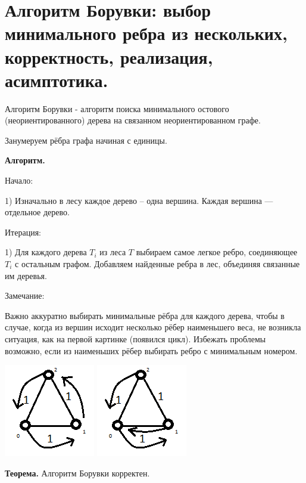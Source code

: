 \setcounter{section}{62}
\section{Алгоритм Борувки: выбор минимального ребра из нескольких, корректность, реализация, асимптотика.}

    Алгоритм Борувки - алгоритм поиска минимального остового (неориентированного) дерева на связанном неориентированном графе.
    
    Занумеруем рёбра графа начиная с единицы.
    
    \textbf{Алгоритм.} 
      
    Начало:
    
    1) Изначально в лесу каждое дерево – одна вершина. Каждая вершина --- отдельное дерево.
        
    Итерация:
    
    1) Для каждого дерева $T_i$ из леса $T$ выбираем самое легкое ребро, соединяющее $T_i$ с остальным графом. Добавляем найденные ребра в лес, объединяя связанные им деревья. 
    
    Замечание: 
    
    Важно аккуратно выбирать минимальные рёбра для каждого дерева, чтобы в случае, когда из вершин исходит несколько рёбер наименьшего веса, не возникла ситуация, как на первой картинке (появился цикл). Избежать проблемы возможно, если из наименьших рёбер выбирать ребро с минимальным номером. 

    \includegraphics[scale=1]{images/63-71_1.png}
    \includegraphics[scale=1]{images/63-71_2.png}
        
    \textbf{Теорема.} Алгоритм Борувки корректен.

